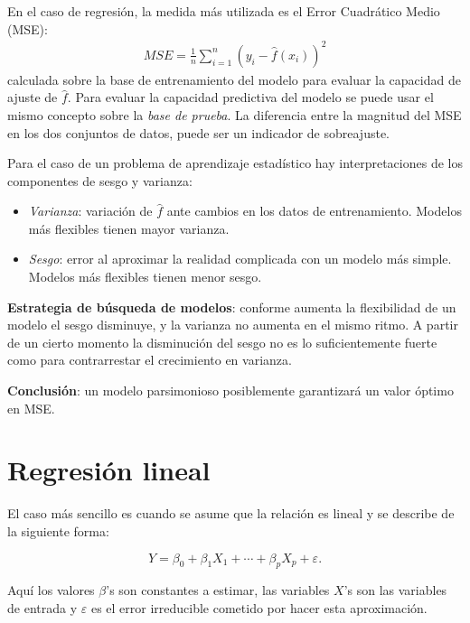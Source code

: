 \documentclass[
  12pt,
]{book}
\providecommand{\tightlist}{%
  \setlength{\itemsep}{0pt}\setlength{\parskip}{0pt}}
\begin{document}
En el caso de regresión, la medida más utilizada es el Error Cuadrático
Medio (MSE): \begin{align*}
MSE=\frac 1 n \sum_{i=1}^n(y_i-\hat f(x_i))^2
\end{align*} calculada sobre la base de entrenamiento del modelo para
evaluar la capacidad de ajuste de \(\hat f\). Para evaluar la capacidad
predictiva del modelo se puede usar el mismo concepto sobre la
\emph{base de prueba}. La diferencia entre la magnitud del MSE en los
dos conjuntos de datos, puede ser un indicador de sobreajuste.

Para el caso de un problema de aprendizaje estadístico hay
interpretaciones de los componentes de sesgo y varianza:

\begin{itemize}
\tightlist
\item
  \emph{Varianza}: variación de \(\hat f\) ante cambios en los datos de
  entrenamiento. Modelos más flexibles tienen mayor varianza.
\item
  \emph{Sesgo}: error al aproximar la realidad complicada con un modelo
  más simple. Modelos más flexibles tienen menor sesgo.
\end{itemize}

\textbf{Estrategia de búsqueda de modelos}: conforme aumenta la
flexibilidad de un modelo el sesgo disminuye, y la varianza no aumenta
en el mismo ritmo. A partir de un cierto momento la disminución del
sesgo no es lo suficientemente fuerte como para contrarrestar el
crecimiento en varianza.

\textbf{Conclusión}: un modelo parsimonioso posiblemente garantizará un
valor óptimo en MSE.

\hypertarget{regresiuxf3n-lineal}{%
\section{Regresión lineal}\label{regresiuxf3n-lineal}}

El caso más sencillo es cuando se asume que la relación es lineal y se
describe de la siguiente forma:

\begin{equation*}
Y = \beta_{0} + \beta_{1}X_{1} + \cdots +  \beta_{p}X_{p} + \varepsilon.
\end{equation*}

Aquí los valores \(\beta\)'s son constantes a estimar, las variables
\(X\)'s son las variables de entrada y \(\varepsilon\) es el error
irreducible cometido por hacer esta aproximación.
\end{document}
